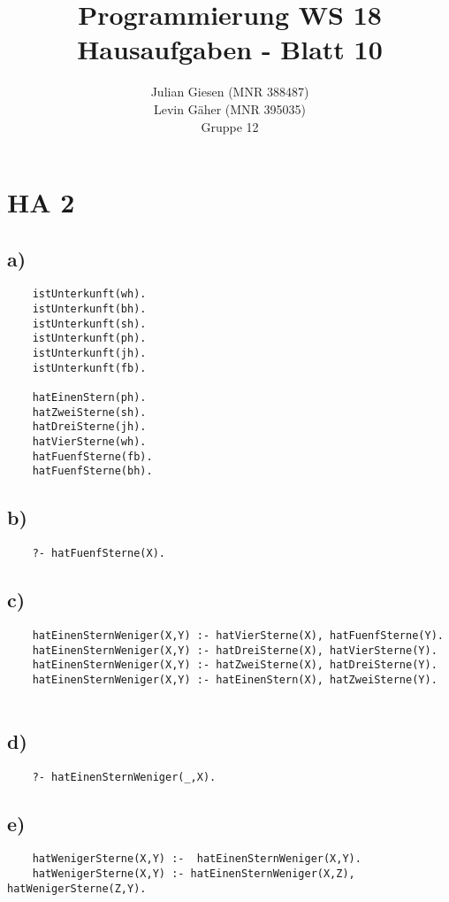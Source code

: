 \documentclass[a4paper]{article}
\title{ Programmierung WS 18 \\ Hausaufgaben - Blatt 10 }
\author{ Julian Giesen (MNR 388487) \\
Levin Gäher (MNR 395035) \\
Gruppe 12 }
\date{  }
\begin{document}
\maketitle

\section*{ HA 2 }
\subsection*{a)}
\begin{lstlisting}
	istUnterkunft(wh).
	istUnterkunft(bh).
	istUnterkunft(sh).
	istUnterkunft(ph).
	istUnterkunft(jh).
	istUnterkunft(fb).
	
	hatEinenStern(ph).
	hatZweiSterne(sh).
	hatDreiSterne(jh).
	hatVierSterne(wh).
	hatFuenfSterne(fb).
	hatFuenfSterne(bh).
\end{lstlisting}

\subsection*{b)}
\begin{lstlisting}
	?- hatFuenfSterne(X).
\end{lstlisting}

\subsection*{c)}
\begin{lstlisting}
	hatEinenSternWeniger(X,Y) :- hatVierSterne(X), hatFuenfSterne(Y).
	hatEinenSternWeniger(X,Y) :- hatDreiSterne(X), hatVierSterne(Y).
	hatEinenSternWeniger(X,Y) :- hatZweiSterne(X), hatDreiSterne(Y).
	hatEinenSternWeniger(X,Y) :- hatEinenStern(X), hatZweiSterne(Y).
	
\end{lstlisting}
\subsection*{d)}
\begin{lstlisting}
	?- hatEinenSternWeniger(_,X).
\end{lstlisting}
\subsection*{e)}
\begin{lstlisting}
	hatWenigerSterne(X,Y) :-  hatEinenSternWeniger(X,Y).
	hatWenigerSterne(X,Y) :- hatEinenSternWeniger(X,Z), hatWenigerSterne(Z,Y).
\end{lstlisting}
\end{document}
